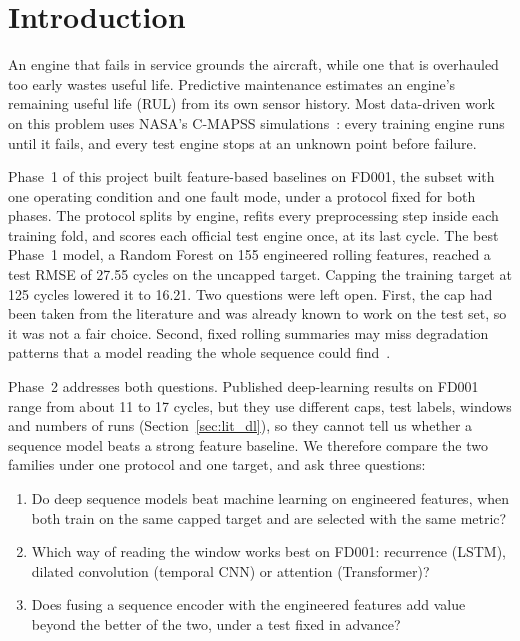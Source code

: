 
\section{Introduction}
\label{sec:introduction}

An engine that fails in service grounds the aircraft, while one that is
overhauled too early wastes useful life. Predictive maintenance estimates an
engine's remaining useful life (RUL) from its own sensor history. Most
data-driven work on this problem uses NASA's C-MAPSS
simulations~\cite{Saxena2008damage}: every training engine runs until it fails,
and every test engine stops at an unknown point before failure.

Phase~1 of this project built feature-based baselines on FD001, the subset
with one operating condition and one fault mode, under a protocol fixed for
both phases. The protocol splits by engine, refits every preprocessing step
inside each training fold, and scores each official test engine once, at its
last cycle. The best Phase~1 model, a Random Forest on 155 engineered rolling
features, reached a test RMSE of 27.55 cycles on the uncapped target. Capping
the training target at 125 cycles lowered it to 16.21. Two questions were left
open. First, the cap had been taken from the literature and was already known
to work on the test set, so it was not a fair choice. Second, fixed rolling
summaries may miss degradation patterns that a model reading the whole
sequence could find~\cite{Zheng2017long}.

Phase~2 addresses both questions. Published deep-learning results on FD001
range from about 11 to 17 cycles, but they use different caps, test labels,
windows and numbers of runs (Section~\ref{sec:lit_dl}), so they cannot tell us
whether a sequence model beats a strong feature baseline. We therefore compare
the two families under one protocol and one target, and ask three questions:
\begin{enumerate}
\item Do deep sequence models beat machine learning on engineered features,
  when both train on the same capped target and are selected with the same
  metric?
\item Which way of reading the window works best on FD001: recurrence (LSTM),
  dilated convolution (temporal CNN) or attention (Transformer)?
\item Does fusing a sequence encoder with the engineered features add value
  beyond the better of the two, under a test fixed in advance?
\end{enumerate}

